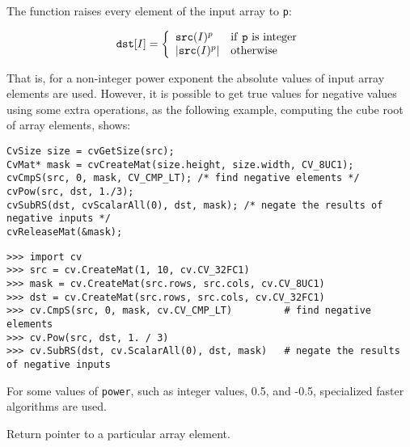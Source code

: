 The function raises every element of the input array to \texttt{p}:

\[
\texttt{dst} [I] = \left\{ \begin{array}{l l} \texttt{src}(I)^p & \mbox{if \texttt{p} is integer}\\ |\texttt{src}(I)^p| & \mbox{otherwise}\\ \end{array} \right.
\]

That is, for a non-integer power exponent the absolute values of input array elements are used. However, it is possible to get true values for negative values using some extra operations, as the following example, computing the cube root of array elements, shows:

\ifC
\begin{lstlisting}
CvSize size = cvGetSize(src);
CvMat* mask = cvCreateMat(size.height, size.width, CV_8UC1);
cvCmpS(src, 0, mask, CV_CMP_LT); /* find negative elements */
cvPow(src, dst, 1./3);
cvSubRS(dst, cvScalarAll(0), dst, mask); /* negate the results of negative inputs */
cvReleaseMat(&mask);
\end{lstlisting}
\else
\begin{lstlisting}
>>> import cv
>>> src = cv.CreateMat(1, 10, cv.CV_32FC1)
>>> mask = cv.CreateMat(src.rows, src.cols, cv.CV_8UC1)
>>> dst = cv.CreateMat(src.rows, src.cols, cv.CV_32FC1)
>>> cv.CmpS(src, 0, mask, cv.CV_CMP_LT)         # find negative elements
>>> cv.Pow(src, dst, 1. / 3)
>>> cv.SubRS(dst, cv.ScalarAll(0), dst, mask)   # negate the results of negative inputs
\end{lstlisting}
\fi

For some values of \texttt{power}, such as integer values, 0.5, and -0.5, specialized faster algorithms are used.

\ifC
{}
Return pointer to a particular array element.


\begin{description}
\end{description}

